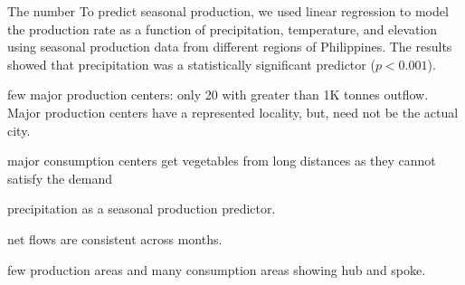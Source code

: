 \documentclass[11pt]{article}
\theoremstyle{definition}
\begin{document}
The number
To predict seasonal production, we used linear regression to model the
production rate as a function of precipitation, temperature, and elevation
using seasonal production data from different regions of Philippines. The
results showed that precipitation was a statistically significant predictor
($p<0.001$).

few major production centers: only 20 with greater than 1K tonnes outflow.
Major production centers have a represented locality, but, need not be the
actual city.

major consumption centers get vegetables from long distances as they cannot
satisfy the demand

precipitation as a seasonal production predictor.

net flows are consistent across months.

few production areas and many consumption areas showing hub and spoke.
\end{document}
